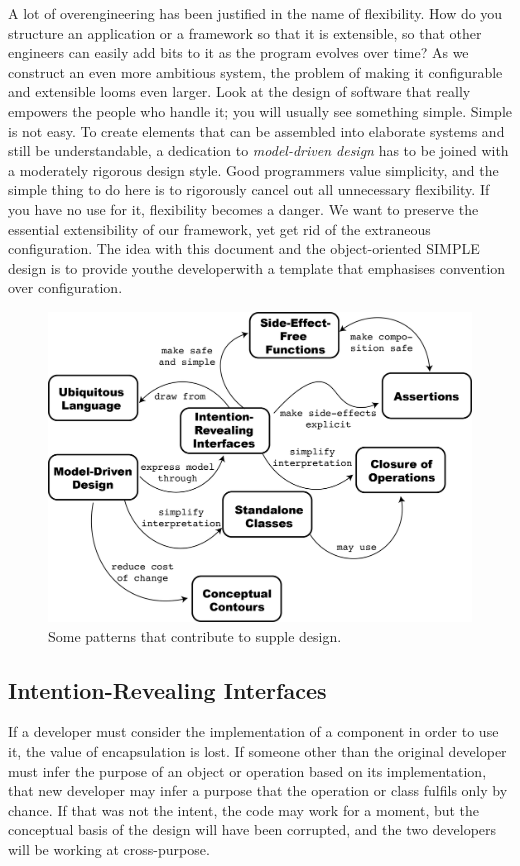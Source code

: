 \documentclass[a4paper,11pt]{article}
\begin{document}
A lot of overengineering has been justified in the name of flexibility. How do you structure an application or a framework so that it is extensible, so that other engineers can easily add bits to it as the program evolves over time? As we construct an even more ambitious system, the problem of making it configurable and extensible looms even larger. Look at the design of software that really empowers the people who handle it; you will usually see something simple. Simple is not easy. To create elements that can be assembled into elaborate systems and still be understandable, a dedication to \textit{model-driven design} has to be joined with a moderately rigorous design style. Good programmers value simplicity, and the simple thing to do here is to rigorously cancel out all unnecessary flexibility. If you have no use for it, flexibility becomes a danger. We want to preserve the essential extensibility of our framework, yet get rid of the extraneous configuration. The idea with this document and the object-oriented SIMPLE design is to provide you\textemdash{}the developer\textemdash{}with a template that emphasises convention over configuration.

\begin{figure}
\includegraphics[keepaspectratio=true,scale=0.6]{./SuppleDesign/SuppleDesign}
\caption{Some patterns that contribute to supple design.}
\end{figure}

\subsection{Intention-Revealing Interfaces}
If a developer must consider the implementation of a component in order to use it, the value of encapsulation is lost. If someone other than the original developer must infer the purpose of an object or operation based on its implementation, that new developer may infer a purpose that the operation or class fulfils only by chance. If that was not the intent, the code may work for a moment, but the conceptual basis of the design will have been corrupted, and the two developers will be working at cross-purpose.
\end{document}
